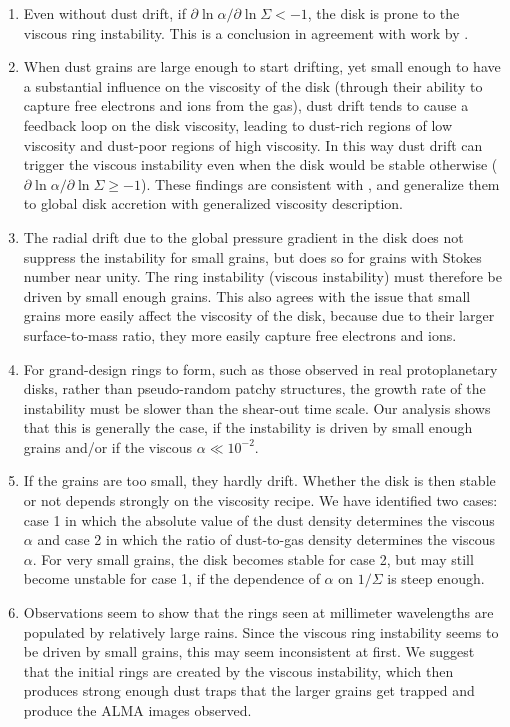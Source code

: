\documentclass{aa}
\newcommand{\revised}[1]{{#1}}
\begin{document}
\begin{enumerate}
\item \revised{Even without dust drift, if $\partial \ln\alpha/\partial\ln\Sigma<-1$,
  the disk is prone to the viscous ring instability. This is a conclusion
  in agreement with work by \citet{2015ApJ...815...99H}.}
\item \revised{When dust grains are large enough to start drifting, yet small enough to
  have a substantial influence on the viscosity of the disk (through their
  ability to capture free electrons and ions from the gas), dust drift tends
  to cause a feedback loop on the disk viscosity, leading to dust-rich regions
  of low viscosity and dust-poor regions of high viscosity. In this way
  dust drift can trigger the viscous instability even when the disk would
  be stable otherwise ($\partial \ln\alpha/\partial\ln\Sigma\ge -1$). These
  findings are consistent with \cite{2011IAUS..274...50J}, and generalize them
  to global disk accretion with generalized viscosity description.}
\item \revised{The radial drift due to the global pressure gradient in the disk
  does not suppress the instability for small grains, but does so for grains
  with Stokes number near unity. The ring instability (viscous instability) must
  therefore be driven by small enough grains. This also agrees with the issue
  that small grains more easily affect the viscosity of the disk, because due to
  their larger surface-to-mass ratio, they more easily capture free electrons
and ions. }
\item \revised{For grand-design rings to form, such as those observed in real
  protoplanetary disks, rather than pseudo-random patchy structures, the
  growth rate of the instability must be slower than the shear-out time scale.
  Our analysis shows that this is generally the case, if the instability is
  driven by small enough grains and/or if the viscous $\alpha\ll 10^{-2}$.}
\item \revised{If the grains are too small, they hardly drift. Whether
  the disk is then stable or not depends strongly on the viscosity recipe.
  We have identified two cases: case 1 in which the absolute value of the
  dust density determines the viscous $\alpha$ and case 2 in which the 
    ratio of dust-to-gas density determines the viscous $\alpha$. For very
  small grains, the disk becomes stable for case 2, but may still become
  unstable for case 1, if the dependence of $\alpha$ on $1/\Sigma$ is steep
  enough.}
\item \revised{Observations seem to show that the rings seen at millimeter
  wavelengths are populated by relatively large rains. Since the viscous
  ring instability seems to be driven by small grains, this may seem inconsistent
  at first. We suggest that the initial rings are created by the viscous
  instability, which then produces strong enough dust traps that the
  larger grains get trapped and produce the ALMA images observed.}
\end{enumerate}
\end{document}
